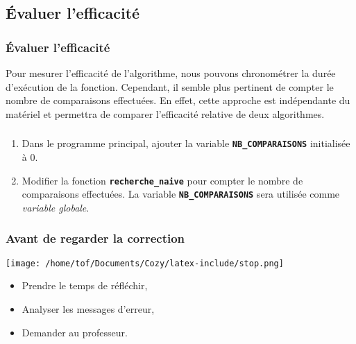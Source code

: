 \documentclass[svgnames,11pt]{beamer}
\begin{document}
\subsection{Évaluer l'efficacité}
\begin{frame}
    \frametitle{Évaluer l'efficacité}
\begin{aretenir}[]
    Pour mesurer l'efficacité de l'algorithme, nous pouvons chronométrer la durée d'exécution de la fonction. Cependant, il semble plus pertinent de compter le nombre de comparaisons effectuées. En effet, cette approche est indépendante du matériel et permettra de comparer l'efficacité relative de deux algorithmes.
\end{aretenir}
    

\end{frame}
\begin{frame}
    \frametitle{}

    \begin{activite}
    \begin{enumerate}
        \item Dans le programme principal, ajouter la variable \textbf{\texttt{NB\_COMPARAISONS}} initialisée à 0.
        \item Modifier la fonction \textbf{\texttt{recherche\_naive}} pour compter le nombre de comparaisons effectuées. La variable \textbf{\texttt{NB\_COMPARAISONS}} sera utilisée comme \emph{variable globale}.
    \end{enumerate}
    \end{activite}

\end{frame}
\begin{frame}
    \frametitle{Avant de regarder la correction}
\begin{center}
    \centering
    \texttt{[image: /home/tof/Documents/Cozy/latex-include/stop.png]}
    \end{center}
{\Large
    \begin{itemize}
        \item Prendre le temps de réfléchir,
        \item Analyser les messages d'erreur,
        \item Demander au professeur.
    \end{itemize}
}
\end{frame}
\end{document}
